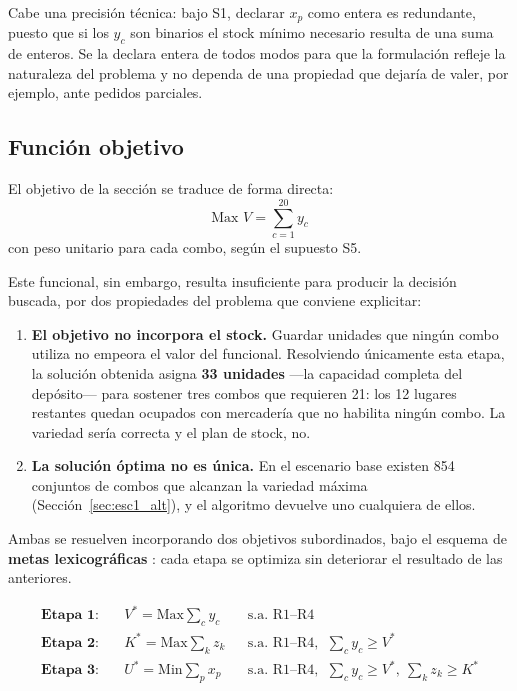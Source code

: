 \documentclass[10pt,a4paper]{article}
\begin{document}
Cabe una precisión técnica: bajo S1, declarar $x_p$ como entera es redundante,
puesto que si los $y_c$ son binarios el stock mínimo necesario resulta de una
suma de enteros. Se la declara entera de todos modos para que la formulación
refleje la naturaleza del problema \cite{catedra-mip} y no dependa de una
propiedad que dejaría de valer, por ejemplo, ante pedidos parciales.

\subsection{Función objetivo}
\label{sec:objetivo}

El objetivo de la sección se traduce de forma directa:
\[
\text{Max } V = \sum_{c=1}^{20} y_c
\]
con peso unitario para cada combo, según el supuesto S5.

Este funcional, sin embargo, resulta insuficiente para producir la decisión
buscada, por dos propiedades del problema que conviene explicitar:

\begin{enumerate}
  \item \textbf{El objetivo no incorpora el stock.} Guardar unidades que ningún
  combo utiliza no empeora el valor del funcional. Resolviendo únicamente esta
  etapa, la solución obtenida asigna \textbf{33 unidades} —la capacidad completa
  del depósito— para sostener tres combos que requieren 21: los 12 lugares
  restantes quedan ocupados con mercadería que no habilita ningún combo. La
  variedad sería correcta y el plan de stock, no.
  \item \textbf{La solución óptima no es única.} En el escenario base existen 854
  conjuntos de combos que alcanzan la variedad máxima
  (Sección~\ref{sec:esc1_alt}), y el algoritmo devuelve uno cualquiera de ellos.
\end{enumerate}

Ambas se resuelven incorporando dos objetivos subordinados, bajo el esquema de
\textbf{metas lexicográficas} \cite{catedra-metas}: cada etapa se optimiza sin
deteriorar el resultado de las anteriores.

\[
\begin{aligned}
\textbf{Etapa 1:}\quad & V^{*} = \text{Max} \sum_c y_c
  && \text{s.a. R1--R4} \\[2pt]
\textbf{Etapa 2:}\quad & K^{*} = \text{Max} \sum_k z_k
  && \text{s.a. R1--R4},\ \ \textstyle\sum_c y_c \geq V^{*} \\[2pt]
\textbf{Etapa 3:}\quad & U^{*} = \text{Min} \sum_p x_p
  && \text{s.a. R1--R4},\ \ \textstyle\sum_c y_c \geq V^{*},\ \sum_k z_k \geq K^{*}
\end{aligned}
\]
\end{document}
